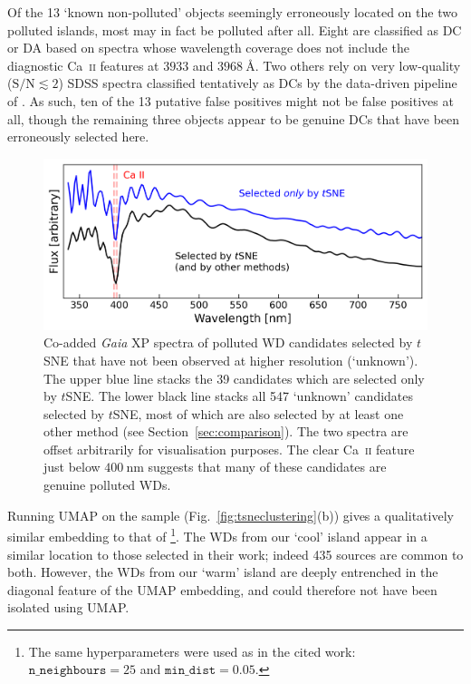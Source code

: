 \documentclass[fleqn,usenatbib]{rasti}
\begin{document}
Of the 13 `known non-polluted' objects seemingly erroneously located on the two polluted islands, most may in fact be polluted after all.
Eight are classified as DC or DA based on spectra whose wavelength coverage does not include the diagnostic Ca~\textsc{ii} features at $3933$ and $3968~\text{\AA}$.
Two others rely on very low-quality ($\mathrm{S/N}\lesssim2$) SDSS spectra classified tentatively as DCs by the data-driven pipeline of \citet{vincent23}.
As such, ten of the 13 putative false positives might not be false positives at all, though the remaining three objects appear to be genuine DCs that have been erroneously selected here.

\begin{figure}
\centering
\includegraphics[width=\textwidth]{figures/fig3_coaddedspectrum.png}
\caption{
    Co-added \textit{Gaia} XP spectra of polluted WD candidates selected by $t$SNE that have not been observed at higher resolution (`unknown').
    The upper blue line stacks the 39 candidates which are selected only by $t$SNE.
    The lower black line stacks all 547 `unknown' candidates selected by $t$SNE, most of which are also selected by at least one other method (see Section~\ref{sec:comparison}).
    The two spectra are offset arbitrarily for visualisation purposes.
    The clear Ca~\textsc{ii} feature just below $400~\text{nm}$ suggests that many of these candidates are genuine polluted WDs.
}
\label{fig:coaddedspectrum}
\end{figure}

Running UMAP on the sample (Fig.~\ref{fig:tsneclustering}(b)) gives a qualitatively similar embedding to that of \citet[cf.\ their fig.~2]{kao24}\footnote{
    The same hyperparameters were used as in the cited work: $\mathtt{n\_neighbours}=25$ and $\mathtt{min\_dist}=0.05$.
}.
The WDs from our `cool' island appear in a similar location to those selected in their work; indeed 435 sources are common to both.
However, the WDs from our `warm' island are deeply entrenched in the diagonal feature of the UMAP embedding, and could therefore not have been isolated using UMAP.
\end{document}
